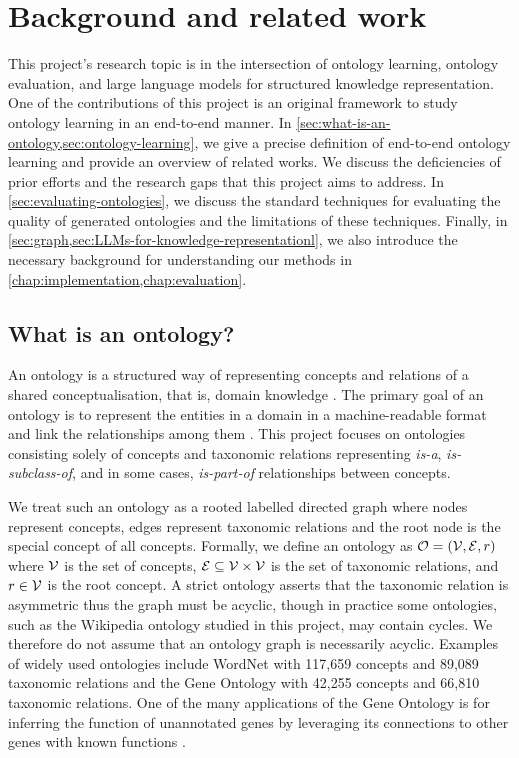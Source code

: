 \chapter{Background and related work}

This project's research topic is in the intersection of ontology learning, ontology evaluation, and large language models for structured knowledge representation. One of the contributions of this project is an original framework to study ontology learning in an end-to-end manner. In \cref{sec:what-is-an-ontology,sec:ontology-learning}, we give a precise definition of end-to-end ontology learning and provide an overview of related works. We discuss the deficiencies of prior efforts and the research gaps that this project aims to address. In \cref{sec:evaluating-ontologies}, we discuss the standard techniques for evaluating the quality of generated ontologies and the limitations of these techniques. Finally, in \cref{sec:graph,sec:LLMs-for-knowledge-representationl}, we also introduce the necessary background for understanding our methods in \cref{chap:implementation,chap:evaluation}.

\section{What is an ontology?}  \label{sec:what-is-an-ontology}

An ontology is a structured way of representing concepts and relations of a shared conceptualisation, that is, domain knowledge \cite{gruber1995toward,gruber1993translation}. The primary goal of an ontology is to represent the entities in a domain in a machine-readable format and link the relationships among them \cite{national2022ontologies}. This project focuses on ontologies consisting solely of concepts and taxonomic relations representing \emph{is-a}, \emph{is-subclass-of}, and in some cases, \emph{is-part-of} relationships between concepts.

We treat such an ontology as a rooted labelled directed graph where nodes represent concepts, edges represent taxonomic relations and the root node is the special concept of all concepts. Formally, we define an ontology as $\mathcal{O} = (\mathcal{V}, \mathcal{E}, r)$ where $\mathcal{V}$ is the set of concepts, $\mathcal{E} \subseteq \mathcal{V} \times \mathcal{V}$ is the set of taxonomic relations, and $r \in \mathcal{V}$ is the root concept. A strict ontology asserts that the taxonomic relation is asymmetric thus the graph must be acyclic, though in practice some ontologies, such as the Wikipedia ontology studied in this project, may contain cycles. We therefore do not assume that an ontology graph is necessarily acyclic. Examples of widely used ontologies include WordNet \cite{miller1995wordnet} with 117,659 concepts and 89,089 taxonomic relations and the Gene Ontology \cite{ashburner2000gene} with 42,255 concepts and 66,810 taxonomic relations. One of the many applications of the Gene Ontology is for inferring the function of unannotated genes by leveraging its connections to other genes with known functions \cite{hu2009we}.

